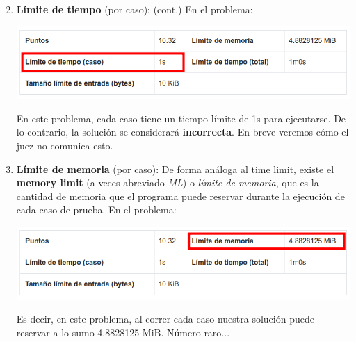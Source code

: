\documentclass{beamer}
\begin{document}
    \begin{frame}[noframenumbering]
        \begin{enumerate}
            \setcounter{enumi}{1}
            \item \textbf{Límite de tiempo} (por caso): (cont.) En el problema: \pause

            \begin{center}
                \includegraphics[width=.6\linewidth]{./ou_tl.png}
            \end{center} \pause

            En este problema, cada caso tiene un tiempo límite de 1s para ejecutarse. De lo contrario, la solución se considerará \textbf{incorrecta}. En breve veremos cómo el juez no comunica esto.

        \item \textbf{Límite de memoria} (por caso): \pause De forma análoga al time limit, existe el \textbf{memory limit} (a veces abreviado \textit{ML}) o \textit{límite de memoria}, que es la cantidad de memoria que el programa puede reservar durante la ejecución de cada caso de prueba. \pause En el problema: \pause
            \begin{center}
                \includegraphics[width=.6\linewidth]{./ou_ml.png}
            \end{center} \pause

            Es decir, en este problema, al correr cada caso nuestra solución puede reservar a lo sumo 4.8828125 MiB. \pause Número raro...
        \end{enumerate}
    \end{frame}
\end{document}
